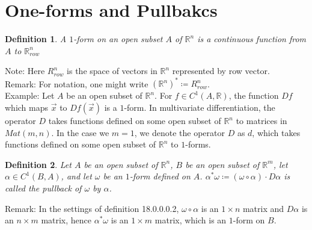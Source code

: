 \documentclass[15pt]{book}
\theoremstyle{break}
\theoremstyle{break}
\newtheorem{defn}{Definition}[corL]
\newcommand{\R}{\mathbb{R}}
\newcommand{\note}{\color{red}Note: \color{black}}
\newcommand{\remark}{\color{blue}Remark: \color{black}}
\newcommand{\example}{\color{green}Example: \color{black}}
\begin{document}
\newpage
\section[One-forms and Pullbacks]{\color{red}One-forms and Pullbakcs\color{black}}
\begin{defn}
A $1$-form on an open subset $A$ of $\R^n$ is a continuous function from $A$ to $\R^n_{row}$
\end{defn}

\note Here $R^n_{row}$ is the space of vectors in $\R^n$ represented by row vector. \\

\remark For notation, one might write $(\R^n)^* \coloneqq R^n_{row}$.\\

\example Let $A$ be an open subset of $\R^n$. For $f \in C^1(A,\R)$, the function $Df$ which maps $\vec{x}$ to $Df(\vec{x})$ is a $1$-form. In multivariate differentiation, the operator $D$ takes functions defined on some open subset of $\R^n$ to matrices in $Mat(m,n)$. In the case we $m=1$, we denote the operator $D$ as $d$, which takes functions defined on some open subset of $\R^n$ to $1$-forms.\\

\begin{defn}
Let $A$ be an open subset of $\R^n$, $B$ be an open subset of $\R^m$, let $\alpha \in C^1(B,A)$, and let $\omega$ be an $1$-form defined on $A$.  $\alpha^*\omega \coloneqq (\omega\circ \alpha) \cdot D\alpha$ is called the pullback of $\omega$ by $\alpha$. 
\end{defn}

\remark In the settings of definition 18.0.0.0.2, $\omega\circ \alpha$ is an $1 \times n$ matrix and $D\alpha$ is an $n \times m$ matrix, hence $\alpha^*\omega$ is an $1 \times m$ matrix, which is an $1$-form on $B$.\\
\end{document}
